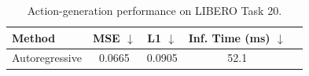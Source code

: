 \begin{table}[h]
\centering
\caption{Action-generation performance on LIBERO Task 20.}
\label{tab:results}
\begin{tabular}{lcccr}
\toprule
Method & MSE $\downarrow$ & L1 $\downarrow$ & Inf. Time (ms) $\downarrow$ \\
\midrule
Autoregressive & 0.0665 & 0.0905 & 52.1 \\
\bottomrule
\end{tabular}
\end{table}
